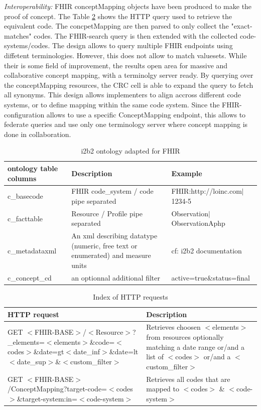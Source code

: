 \documentclass{amia}
\begin{document}
\textit{Interoperability: }FHIR conceptMapping objects have been produced to make the proof of concept. The Table \ref{tab2} shows the HTTP query used to retrieve the equivalent code. The concpetMapping are then parsed to only collect the "exact-matches" codes. The FHIR-search query is then extended with the collected code-systems/codes. The design allows to query multiple FHIR endpoints using diffetent terminologies. However, this does not allow to match valuesets. While their is some field of improvement, the results open area for massive and collaborative concept mapping, with a terminolgy server ready.
By querying over the conceptMapping resources, the CRC cell is able to expand the query to fetch all synonyms. This design allows implementers to align accross different code systems, or to define mapping within the same code system. Since the FHIR-configuration allows to use a specific ConceptMapping endpoint, this allows to federate queries and use only one terminology server where concept mapping is done in collaboration.

\begin{table}[h!]
\centering
	\begin{tabular}{|p{2cm}|p{6cm}|p{5cm}|}
  \hline
		\textbf{ontology table columns}    & \textbf{Description} & \textbf{Example} \\ \hline
		c\_basecode  &  FHIR code\_system / code pipe separated  & FHIR:http://loinc.com$|$1234-5  \\ \hline
		c\_facttable  &  Resource / Profile pipe separated  & Observation$|$ObservationAphp  \\ \hline
		c\_metadataxml  &  An xml describing datatype (numeric, free text or enumerated) and measure units  & cf: i2b2 documentation   \\ \hline
		c\_concept\_cd  &  an optionnal additional filter  & active=true\&status=final  \\ \hline
  \end{tabular}
	\label{tab1}
\caption{i2b2 ontology adapted for FHIR}
\end{table}

\begin{table}[h!]
\centering
	\begin{tabular}{|p{6cm}|p{10cm}|}
  \hline
    \textbf{HTTP request}    & \textbf{Description}  \\ \hline
		GET $<$FHIR-BASE$>$/$<$Resource$>$\newline?\_elements=$<$elements$>$\&code=$<$codes$>$\newline\&date=gt$<$date\_inf$>$\&date=lt$<$date\_sup$>$\newline\&$<$custom\_filter$>$  & Retrieves choosen $<$elements$>$ from resources optionally matching a date range or/and a list of $<$codes$>$  or/and a $<$custom\_filter$>$     \\ \hline
	 GET $<$FHIR-BASE$>$/ConceptMapping\newline?target-code=$<$codes$>$\&target-system:in=$<$code-system$>$  & Retrieves all codes that are mapped to $<$codes$>$ \& $<$code-system$>$   \\ \hline
  \end{tabular}
	\label{tab2}
\caption{Index of HTTP requests}
\end{table}
\end{document}
